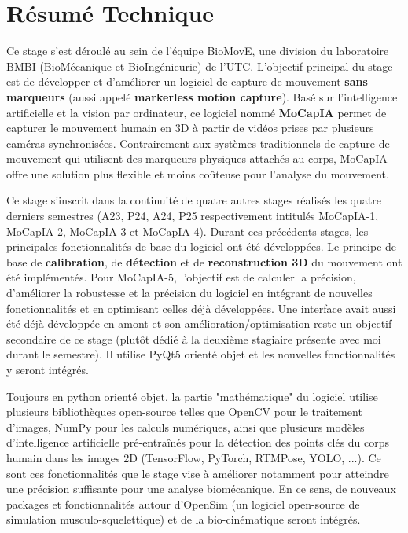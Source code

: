 \chapter{Résumé Technique}

\vspace{\fill}

   Ce stage s'est déroulé au sein de l'équipe BioMovE, une division du laboratoire BMBI (BioMécanique et BioIngénieurie) de l'UTC. L'objectif principal du stage est de développer et d'améliorer un logiciel de capture de mouvement \textbf{sans marqueurs} (aussi appelé \textbf{markerless motion capture}). Basé sur l'intelligence artificielle et la vision par ordinateur, ce logiciel nommé \textbf{MoCapIA} permet de capturer le mouvement humain en 3D à partir de vidéos prises par plusieurs caméras synchronisées. Contrairement aux systèmes traditionnels de capture de mouvement qui utilisent des marqueurs physiques attachés au corps, MoCapIA offre une solution plus flexible et moins coûteuse pour l'analyse du mouvement.
   
   Ce stage s'inscrit dans la continuité de quatre autres stages réalisés les quatre derniers semestres (A23, P24, A24, P25 respectivement intitulés MoCapIA-1, MoCapIA-2, MoCapIA-3 et MoCapIA-4). Durant ces précédents stages, les principales fonctionnalités de base du logiciel ont été développées. Le principe de base de \textbf{calibration}, de \textbf{détection} et de \textbf{reconstruction 3D} du mouvement ont été implémentés. Pour MoCapIA-5, l'objectif est de calculer la précision, d'améliorer la robustesse et la précision du logiciel en intégrant de nouvelles fonctionnalités et en optimisant celles déjà développées. Une interface avait aussi été déjà développée en amont et son amélioration/optimisation reste un objectif secondaire de ce stage (plutôt dédié à la deuxième stagiaire présente avec moi durant le semestre). Il utilise PyQt5 orienté objet et les nouvelles fonctionnalités y seront intégrés.
   
   Toujours en python orienté objet, la partie "mathématique" du logiciel utilise plusieurs bibliothèques open-source telles que OpenCV pour le traitement d'images, NumPy pour les calculs numériques, ainsi que plusieurs modèles d'intelligence artificielle pré-entraînés pour la détection des points clés du corps humain dans les images 2D (TensorFlow, PyTorch, RTMPose, YOLO, ...). Ce sont ces fonctionnalités que le stage vise à améliorer notamment pour atteindre une précision suffisante pour une analyse biomécanique. En ce sens, de nouveaux packages et fonctionnalités autour d'OpenSim (un logiciel open-source de simulation musculo-squelettique) et de la bio-cinématique seront intégrés.

    
  \vspace{\fill}
\vfill